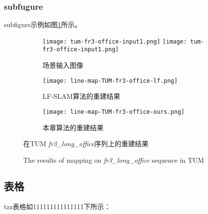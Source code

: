\subsubsection{subfugure}
subfigure示例如图\ref{fig:line_optim:map}所示。

\begin{figure}[htb]
	\centering
    \begin{subfigure}[b]{0.8\textwidth}
		\centering
        \texttt{[image: tum-fr3-office-input1.png]} %
        \texttt{[image: tum-fr3-office-input1.png]}
        \caption{场景输入图像}
    \end{subfigure}
    \vspace{0.3cm}
    \begin{subfigure}[b]{0.45\textwidth}
        \centering
        \texttt{[image: line-map-TUM-fr3-office-lf.png]}
        \caption{LF-SLAM算法的重建结果}
    \end{subfigure}
    \vspace{0.2cm}
    \begin{subfigure}[b]{0.45\textwidth}
        \centering
        \texttt{[image: line-map-TUM-fr3-office-ours.png]}
        \caption{本章算法的重建结果}
    \end{subfigure}
    \vspace{0.2cm}
	\caption{在TUM {\itshape fr3\_long\_office}序列上的重建结果}
    \label{fig:line_optim:map}
    \addtocounter{figure}{-1}
    \renewcommand{\figurename}{Fig.}
    \caption{The results of mapping on {\itshape fr3\_long\_office} sequence in TUM}
\end{figure}

\subsection{表格}

tzz表格如111111111111111下所示：

